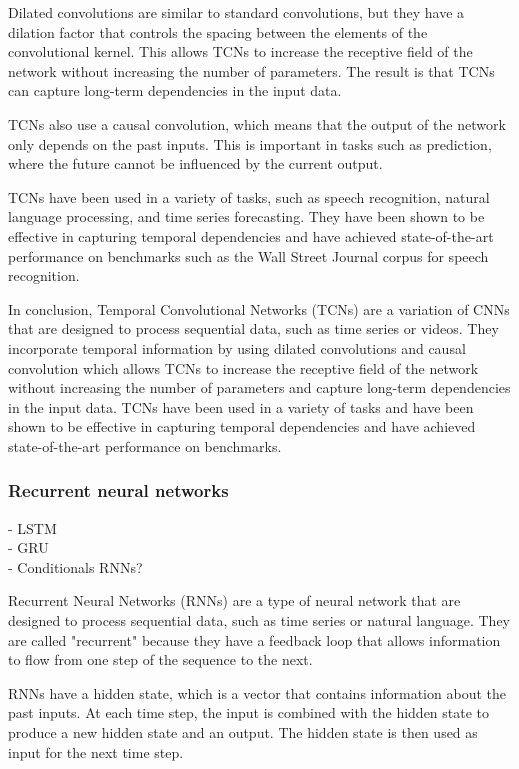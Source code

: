 Dilated convolutions are similar to standard convolutions, but they have a dilation factor that controls the spacing between the elements of the convolutional kernel. This allows TCNs to increase the receptive field of the network without increasing the number of parameters. The result is that TCNs can capture long-term dependencies in the input data.

TCNs also use a causal convolution, which means that the output of the network only depends on the past inputs. This is important in tasks such as prediction, where the future cannot be influenced by the current output.

TCNs have been used in a variety of tasks, such as speech recognition, natural language processing, and time series forecasting. They have been shown to be effective in capturing temporal dependencies and have achieved state-of-the-art performance on benchmarks such as the Wall Street Journal corpus for speech recognition.

In conclusion, Temporal Convolutional Networks (TCNs) are a variation of CNNs that are designed to process sequential data, such as time series or videos. They incorporate temporal information by using dilated convolutions and causal convolution which allows TCNs to increase the receptive field of the network without increasing the number of parameters and capture long-term dependencies in the input data. TCNs have been used in a variety of tasks and have been shown to be effective in capturing temporal dependencies and have achieved state-of-the-art performance on benchmarks.


\subsubsection{Recurrent neural networks}
- LSTM\\
- GRU\\
- Conditionals RNNs?

Recurrent Neural Networks (RNNs) are a type of neural network that are designed to process sequential data, such as time series or natural language. They are called "recurrent" because they have a feedback loop that allows information to flow from one step of the sequence to the next.

RNNs have a hidden state, which is a vector that contains information about the past inputs. At each time step, the input is combined with the hidden state to produce a new hidden state and an output. The hidden state is then used as input for the next time step.

